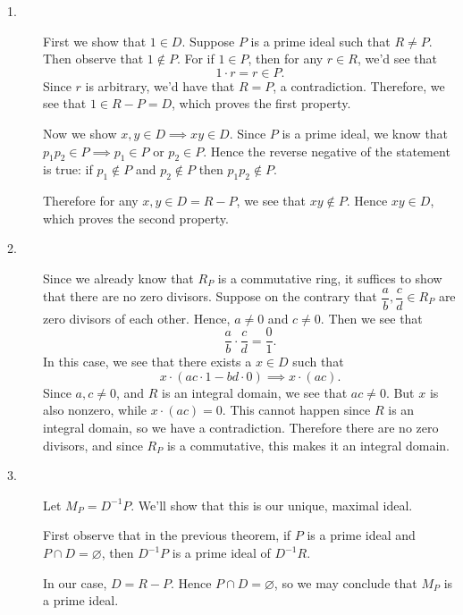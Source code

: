 \documentclass[12pt,letterpaper]{algebra_book}
\theoremstyle{definition}
\begin{document}
\begin{prf}
    \begin{description}
        \item[1.] First we show that $1 \in D$. 
        Suppose $P$ is a prime ideal such that $R \ne P$. Then
        observe that $1 \not\in P$. For if $1 \in P$, then for any $r
        \in R$, we'd see that 
        \[
            1 \cdot r = r \in P.
        \]
        Since $r$ is arbitrary, we'd have that $R = P$, a
        contradiction. Therefore, we see that $1 \in R - P = D$, which
        proves the first property.
        
        Now we show $x, y \in D \implies xy \in D$. Since $P$ is a prime ideal, we know that
        $p_1p_2 \in P \implies p_1 \in P$ or $p_2 \in P$. Hence the reverse
        negative of the statement is true: if $p_1 \not\in P$ and $p_2
        \not\in P$ then $p_1p_2 \not\in P$. 
        
        Therefore for any $x, y
        \in D =R - P$, we see that $xy \not\in P$. Hence $xy \in D$, which
        proves the second property.

        \item[2.] Since we already know that $R_P$ is a commutative ring,
        it suffices to show that there are no zero divisors. Suppose
        on the contrary that $\dfrac{a}{b}, \dfrac{c}{d} \in R_P$ are
        zero divisors of each other. Hence, $a \ne 0$ and $c \ne 0$.
        Then we see that 
        \[
            \frac{a}{b} \cdot \frac{c}{d} = \frac{0}{1}.
        \]
        In this case, we see that there exists a $x \in D$ such that 
        \[
            x \cdot (ac \cdot 1 - bd \cdot 0) \implies x \cdot(ac).            
        \]
        Since $a, c \ne 0$, and $R$ is an integral domain, we see that
        $ac \ne 0$. But $x$ is also nonzero, while $x \cdot (ac) =
        0$. This cannot happen since $R$ is an integral domain, so we
        have a contradiction. Therefore there are no zero divisors,
        and since $R_P$ is a commutative, this makes it an integral
        domain. 

        \item[3.] Let $M_P = D^{-1}P$. We'll show that this is our unique,
        maximal ideal. 

        First observe that in the previous theorem, if $P$ is a prime
        ideal and $P \cap D = \varnothing$, then $D^{-1}P$ is a prime
        ideal of $D^{-1}R$. 
        
        In our case, $D = R - P$. Hence $P \cap D
        = \varnothing$, so we may conclude that $M_P$ is a prime
        ideal.
        

\end{description}
\end{prf}
\end{document}
